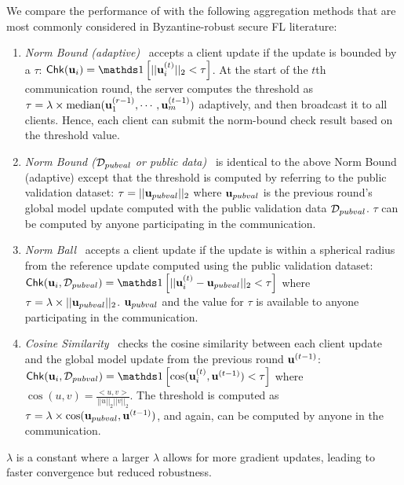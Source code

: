  We compare the performance of \ours with the following aggregation methods that are most commonly considered in Byzantine-robust secure FL literature: 
\begin{enumerate}
    \item \textit{Norm Bound (adaptive)}~\cite{rofl, elsa} accepts a client update if the update is bounded by a $\tau$: $\msf{Chk}(\bfu_i) = \indicator{||\bfu_i^{(t)}||_2 < \tau}$.
    At the start of the $t$th communication round, the server computes the threshold as $\tau = \lambda \times \text{median}(\mathbf{u}_1^{(r-1)}, \cdots, \mathbf{u}_m^{(t-1)})$ adaptively, and then broadcast it to all clients. Hence, each client can submit the norm-bound check result based on the threshold value.

    \item \textit{Norm Bound ($\mathcal{D}_{pubval}$ or public data)}~\cite{CCS:CGJv22} is identical to the above Norm Bound (adaptive) except that the threshold is computed by referring to the public validation dataset: $\tau = ||\mathbf{u}_{pubval}||_2$ where $\mathbf{u}_{pubval}$ is the previous round's global model update computed with the public validation data $\mathcal{D}_{pubval}$. $\tau$ can be computed by anyone participating in the communication.

    \item \textit{Norm Ball}~\cite{steinhardt2017normball,CCS:CGJv22} accepts a client update if the update is within a spherical radius from the reference %
    update computed using the public validation dataset: $\msf{Chk}(\bfu_i, \calD_{pubval}) = \indicator{||\bfu_i^{(t)} - \bfu_{pubval}||_2 < \tau}$ where $\tau = \lambda \times ||\mathbf{u}_{pubval}||_2$. $\mathbf{u}_{pubval}$ and the value for $\tau$ is available to anyone participating in the communication.

    \item \textit{Cosine Similarity}~\cite{cao2020fltrust,CCS:CGJv22} checks the cosine similarity between each client update and the global model update from the previous round $\mathbf{u}^{(t-1)}$: $\msf{Chk}(\bfu_i, \calD_{pubval}) = \indicator{\cos(\bfu_i^{(t)}, \bfu^{(t-1)}) < \tau}$ where $\cos(u, v) = \frac{<u, v>}{||u||_2 ||v||_2}$. The threshold is computed as $\tau = \lambda \times \cos(\mathbf{u}_{pubval}, \mathbf{u}^{(t-1)})$, and again, can be computed by anyone in the communication.
\end{enumerate}

$\lambda$ is a constant where a larger $\lambda$ allows for more gradient updates, leading to faster convergence but reduced robustness.


